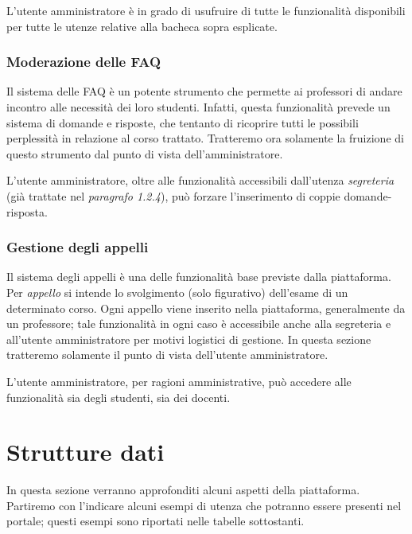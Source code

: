 \documentclass [a4paper,11pt]{book}
\begin{document}
L'utente amministratore è in grado di usufruire di tutte le funzionalità disponibili per tutte le utenze relative alla bacheca sopra esplicate.

\medskip

\subsubsection{Moderazione delle FAQ}

Il sistema delle FAQ è un potente strumento che permette ai professori di andare incontro alle necessità dei loro studenti. Infatti, questa funzionalità prevede un sistema di domande e risposte, che tentanto di ricoprire tutti le possibili perplessità in relazione al corso trattato. Tratteremo ora solamente la fruizione di questo strumento dal punto di vista dell'amministratore.

L'utente amministratore, oltre alle funzionalità accessibili dall'utenza  \emph{segreteria} (già trattate nel \emph{paragrafo 1.2.4}), può forzare l'inserimento di coppie domande-risposta.

\medskip

\subsubsection{Gestione degli appelli}

Il sistema degli appelli è una delle funzionalità base previste dalla piattaforma. Per \emph{appello} si intende lo svolgimento (solo figurativo) dell'esame di un determinato corso. Ogni appello viene inserito nella piattaforma, generalmente da un professore; tale funzionalità in ogni caso è accessibile anche alla segreteria e all'utente amministratore per motivi logistici di gestione. In questa sezione tratteremo solamente il punto di vista dell'utente amministratore.

L'utente amministratore, per ragioni amministrative, può accedere alle funzionalità sia degli studenti, sia dei docenti.

\medskip

\section{Strutture dati}
In questa sezione verranno approfonditi alcuni aspetti della piattaforma. Partiremo con l'indicare alcuni esempi di utenza che potranno essere presenti nel portale; questi esempi sono riportati nelle tabelle sottostanti.

\medskip
\end{document}
